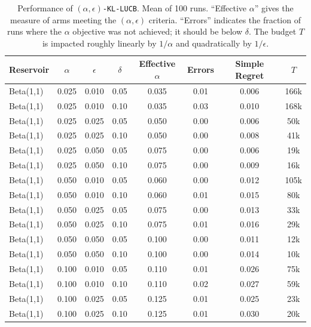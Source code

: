 \begin{table}
\caption{Performance of \texttt{$(\alpha,\epsilon)$-KL-LUCB}.
Mean of 100 runs.
``Effective $\alpha$'' gives the measure of arms meeting the $(\alpha,\epsilon)$
criteria.
``Errors'' indicates the fraction of runs where the $\alpha$
objective was not achieved; it should be below $\delta$.
The budget $T$ is impacted roughly linearly by $1/\alpha$ and quadratically 
by $1/\epsilon$.
}
\label{tbl-results-new}
\vskip 0.15in
\begin{center}
\begin{small}
\begin{sc}
\begin{tabular}{lccc|cccc}
\hline
Reservoir & $\alpha$ & $\epsilon$ & $\delta$ & Effective $\alpha$ & Errors & Simple Regret & $T$ \\
\hline
Beta(1,1) & 0.025 & 0.010 & 0.05 & 0.035 & 0.01 & 0.006 & 166k \\
Beta(1,1) & 0.025 & 0.010 & 0.10 & 0.035 & 0.03 & 0.010 & 168k \\
Beta(1,1) & 0.025 & 0.025 & 0.05 & 0.050 & 0.00 & 0.006 & 50k \\
Beta(1,1) & 0.025 & 0.025 & 0.10 & 0.050 & 0.00 & 0.008 & 41k \\
Beta(1,1) & 0.025 & 0.050 & 0.05 & 0.075 & 0.00 & 0.006 & 19k \\
Beta(1,1) & 0.025 & 0.050 & 0.10 & 0.075 & 0.00 & 0.009 & 16k \\
Beta(1,1) & 0.050 & 0.010 & 0.05 & 0.060 & 0.00 & 0.012 & 105k \\
Beta(1,1) & 0.050 & 0.010 & 0.10 & 0.060 & 0.01 & 0.015 & 80k \\
Beta(1,1) & 0.050 & 0.025 & 0.05 & 0.075 & 0.00 & 0.013 & 33k \\
Beta(1,1) & 0.050 & 0.025 & 0.10 & 0.075 & 0.01 & 0.016 & 29k \\
Beta(1,1) & 0.050 & 0.050 & 0.05 & 0.100 & 0.00 & 0.011 & 12k \\
Beta(1,1) & 0.050 & 0.050 & 0.10 & 0.100 & 0.00 & 0.014 & 10k \\
Beta(1,1) & 0.100 & 0.010 & 0.05 & 0.110 & 0.01 & 0.026 & 75k \\
Beta(1,1) & 0.100 & 0.010 & 0.10 & 0.110 & 0.02 & 0.027 & 59k \\
Beta(1,1) & 0.100 & 0.025 & 0.05 & 0.125 & 0.01 & 0.025 & 23k \\
Beta(1,1) & 0.100 & 0.025 & 0.10 & 0.125 & 0.01 & 0.030 & 20k \\

\end{tabular}
\end{sc}
\end{small}
\end{center}
\end{table}
